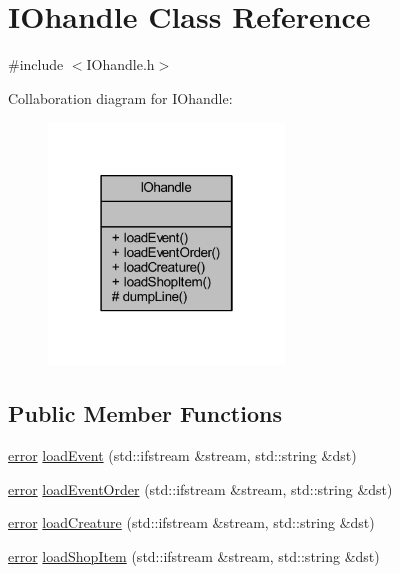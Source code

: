 \hypertarget{class_i_ohandle}{}\section{I\+Ohandle Class Reference}
\label{class_i_ohandle}


{\ttfamily \#include $<$I\+Ohandle.\+h$>$}



Collaboration diagram for I\+Ohandle\+:\nopagebreak
\begin{figure}[H]
\begin{center}
\leavevmode
\includegraphics[width=178pt]{class_i_ohandle__coll__graph}
\end{center}
\end{figure}
\subsection*{Public Member Functions}
\begin{DoxyCompactItemize}
\item 
\mbox{\hyperlink{_errors_list_8h_af10dacfa214e2575bb2e0ee407c242e0}{error}} \mbox{\hyperlink{class_i_ohandle_a42f66760fa3e33400921dcb8d9a8cd57}{load\+Event}} (std\+::ifstream \&stream, std\+::string \&dst)
\item 
\mbox{\hyperlink{_errors_list_8h_af10dacfa214e2575bb2e0ee407c242e0}{error}} \mbox{\hyperlink{class_i_ohandle_a8d076d0076c358e63e1e993309c35b2a}{load\+Event\+Order}} (std\+::ifstream \&stream, std\+::string \&dst)
\item 
\mbox{\hyperlink{_errors_list_8h_af10dacfa214e2575bb2e0ee407c242e0}{error}} \mbox{\hyperlink{class_i_ohandle_a99dd11dfe48cea80e164a9d7477aad5f}{load\+Creature}} (std\+::ifstream \&stream, std\+::string \&dst)
\item 
\mbox{\hyperlink{_errors_list_8h_af10dacfa214e2575bb2e0ee407c242e0}{error}} \mbox{\hyperlink{class_i_ohandle_a4870dc9635a6c30ef483d699dffd8774}{load\+Shop\+Item}} (std\+::ifstream \&stream, std\+::string \&dst)
\end{DoxyCompactItemize}

